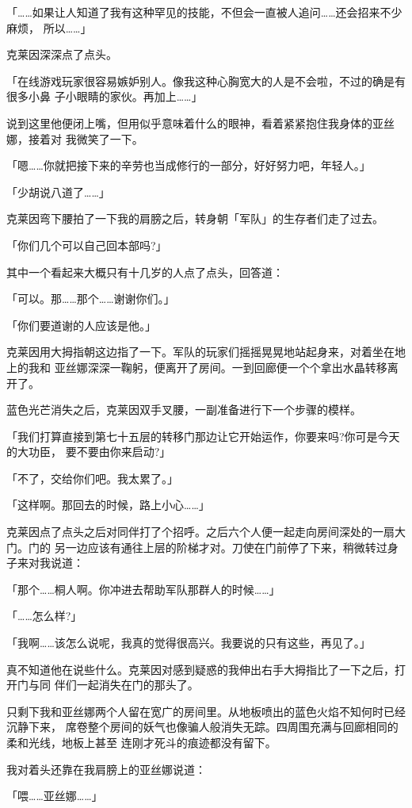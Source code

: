 \documentclass[11pt]{book}
\begin{document}
「……如果让人知道了我有这种罕见的技能，不但会一直被人追问……还会招来不少麻烦，
所以……」

克莱因深深点了点头。

「在线游戏玩家很容易嫉妒别人。像我这种心胸宽大的人是不会啦，不过的确是有很多小鼻
子小眼睛的家伙。再加上……」

说到这里他便闭上嘴，但用似乎意味着什么的眼神，看着紧紧抱住我身体的亚丝娜，接着对
我微笑了一下。

「嗯……你就把接下来的辛劳也当成修行的一部分，好好努力吧，年轻人。」

「少胡说八道了……」

克莱因弯下腰拍了一下我的肩膀之后，转身朝「军队」的生存者们走了过去。

「你们几个可以自己回本部吗?」

其中一个看起来大概只有十几岁的人点了点头，回答道：

「可以。那……那个……谢谢你们。」

「你们要道谢的人应该是他。」

克莱因用大拇指朝这边指了一下。军队的玩家们摇摇晃晃地站起身来，对着坐在地上的我和
亚丝娜深深一鞠躬，便离开了房间。一到回廊便一个个拿出水晶转移离开了。

蓝色光芒消失之后，克莱因双手叉腰，一副准备进行下一个步骤的模样。

「我们打算直接到第七十五层的转移门那边让它开始运作，你要来吗?你可是今天的大功臣，
要不要由你来启动?」

「不了，交给你们吧。我太累了。」

「这样啊。那回去的时候，路上小心……」

克莱因点了点头之后对同伴打了个招呼。之后六个人便一起走向房间深处的一扇大门。门的
另一边应该有通往上层的阶梯才对。刀使在门前停了下来，稍微转过身子来对我说道：

「那个……桐人啊。你冲进去帮助军队那群人的时候……」

「……怎么样?」

「我啊……该怎么说呢，我真的觉得很高兴。我要说的只有这些，再见了。」

真不知道他在说些什么。克莱因对感到疑惑的我伸出右手大拇指比了一下之后，打开门与同
伴们一起消失在门的那头了。

只剩下我和亚丝娜两个人留在宽广的房间里。从地板喷出的蓝色火焰不知何时已经沉静下来，
席卷整个房间的妖气也像骗人般消失无踪。四周围充满与回廊相同的柔和光线，地板上甚至
连刚才死斗的痕迹都没有留下。

我对着头还靠在我肩膀上的亚丝娜说道：

「喂……亚丝娜……」
\end{document}
